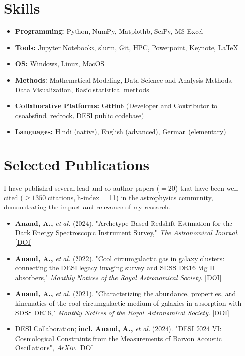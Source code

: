 \documentclass[a4paper,11pt]{article}
\begin{document}
\section*{Skills}
\begin{itemize}[noitemsep, topsep=0pt]
    \item \textbf{Programming:} Python, NumPy, Matplotlib, SciPy, MS-Excel
    \item \textbf{Tools:} Jupyter Notebooks, slurm, Git, HPC, Powerpoint, Keynote, LaTeX
    \item \textbf{OS:} Windows, Linux, MacOS
    \item \textbf{Methods:} Mathematical Modeling, Data Science and Analysis Methods, Data Visualization, Basic statistical methods
    \item \textbf{Collaborative Platforms:} GitHub (Developer and Contributor to \href{https://github.com/abhi0395/qsoabsfind}{qsoabsfind}, \href{https://github.com/desihub/redrock}{redrock}, \href{https://github.com/desihub}{DESI public codebase})
     \item \textbf{Languages:} Hindi (native), English (advanced), German (elementary)
\end{itemize}

\section*{Selected Publications}
I have published several lead and co-author papers ($= 20$) that have been well-cited ($\geq 1350$ citations, h-index = 11) in the astrophysics community, demonstrating the impact and relevance of my research.
\begin{itemize}[noitemsep, topsep=0pt]
    \item \textbf{Anand, A.,} \textit{et al.} (2024). "Archetype-Based Redshift Estimation for the Dark Energy Spectroscopic Instrument Survey," \textit{The Astronomical Journal}. \href{https://iopscience.iop.org/article/10.3847/1538-3881/ad60c2}{[DOI]}
    \item \textbf{Anand, A.,} \textit{et al.} (2022). "Cool circumgalactic gas in galaxy clusters: connecting the DESI legacy imaging survey and SDSS DR16 Mg II absorbers," \textit{Monthly Notices of the Royal Astronomical Society}. \href{https://doi.org/10.1093/mnras/stab871}{[DOI]}
    \item \textbf{Anand, A.,} \textit{et al.} (2021). "Characterizing the abundance, properties, and kinematics of the cool circumgalactic medium of galaxies in absorption with SDSS DR16," \textit{Monthly Notices of the Royal Astronomical Society}. \href{https://doi.org/10.1093/mnras/stac928}{[DOI]}
    \item DESI Collaboration; \textbf{incl. Anand, A.,} \textit{et al.} (2024). "DESI 2024 VI: Cosmological Constraints from the Measurements of Baryon Acoustic Oscillations", \textit{ArXiv}. \href{10.48550/arXiv.2404.03002}{[DOI]}
\end{itemize}
\end{document}

